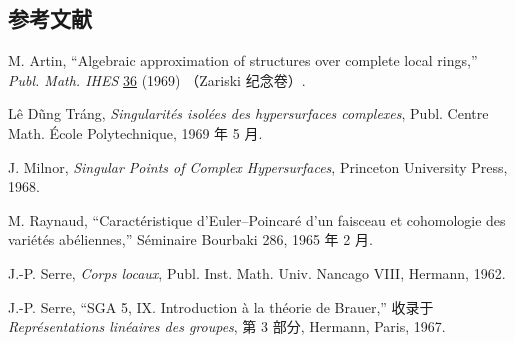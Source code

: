 \subsection*{参考文献}

\begin{enumerate}[label={[\arabic*]},leftmargin=3em]
\item M. Artin, ``Algebraic approximation of structures over complete
local rings,'' \emph{Publ. Math. IHES} \underline{36} (1969)
（Zariski 纪念卷）.
\item L\^e D\~ung Tr\'ang, \emph{Singularit\'es isol\'ees des
hypersurfaces complexes}, Publ. Centre Math. \'Ecole Polytechnique,
1969 年 5 月.
\item J. Milnor, \emph{Singular Points of Complex Hypersurfaces},
Princeton University Press, 1968.
\item M. Raynaud, ``Caract\'eristique d'Euler--Poincar\'e d'un
faisceau et cohomologie des vari\'et\'es ab\'eliennes,'' S\'eminaire
Bourbaki 286, 1965 年 2 月.
\item J.-P. Serre, \emph{Corps locaux}, Publ. Inst. Math. Univ.
Nancago VIII, Hermann, 1962.
\item J.-P. Serre, ``SGA 5, IX. Introduction \`a la th\'eorie de
Brauer,'' 收录于 \emph{Repr\'esentations lin\'eaires des
groupes}, 第 3 部分, Hermann, Paris, 1967.
\end{enumerate}
